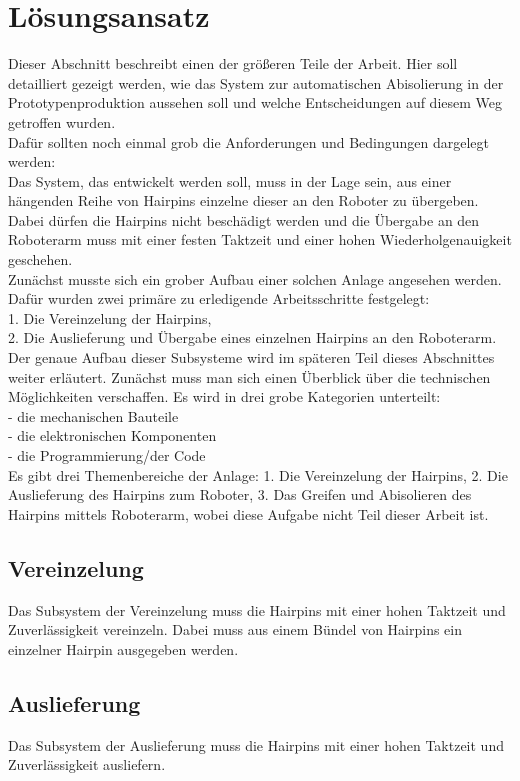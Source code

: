 \section{Lösungsansatz}\label{sec:loesungsansatz}
Dieser Abschnitt beschreibt einen der größeren Teile der Arbeit. Hier soll detailliert gezeigt werden, wie das System
zur automatischen Abisolierung in der Prototypenproduktion aussehen soll und welche Entscheidungen auf diesem Weg
getroffen wurden.\\
Dafür sollten noch einmal grob die Anforderungen und Bedingungen dargelegt werden:\\
Das System, das entwickelt werden soll, muss in der Lage sein, aus einer hängenden Reihe von Hairpins einzelne dieser
an den Roboter zu übergeben. Dabei dürfen die Hairpins nicht beschädigt werden und die Übergabe an den Roboterarm
muss mit einer festen Taktzeit und einer hohen Wiederholgenauigkeit geschehen.\\
Zunächst musste sich ein grober Aufbau einer solchen Anlage angesehen werden. Dafür wurden zwei primäre zu erledigende
Arbeitsschritte festgelegt:\\
1. Die Vereinzelung der Hairpins,\\
2. Die Auslieferung und Übergabe eines einzelnen Hairpins an den Roboterarm.\\
Der genaue Aufbau dieser Subsysteme wird im späteren Teil dieses Abschnittes weiter erläutert. Zunächst muss man sich
einen Überblick über die technischen Möglichkeiten verschaffen. Es wird in drei grobe Kategorien unterteilt:\\
- die mechanischen Bauteile \\
- die elektronischen Komponenten \\
- die Programmierung/der Code \\


Es gibt drei Themenbereiche der Anlage:
1. Die Vereinzelung der Hairpins,
2. Die Auslieferung des Hairpins zum Roboter,
3. Das Greifen und Abisolieren des Hairpins mittels Roboterarm, wobei diese Aufgabe nicht Teil dieser Arbeit ist.


\subsection{Vereinzelung}\label{sec:Vereinzelung}
Das Subsystem der Vereinzelung muss die Hairpins mit einer hohen Taktzeit
und Zuverlässigkeit vereinzeln. Dabei muss aus einem Bündel von Hairpins ein
einzelner Hairpin ausgegeben werden.
%
\subsection{Auslieferung}\label{sec:Auslieferung}
Das Subsystem der Auslieferung muss die Hairpins mit einer hohen Taktzeit
und Zuverlässigkeit ausliefern.